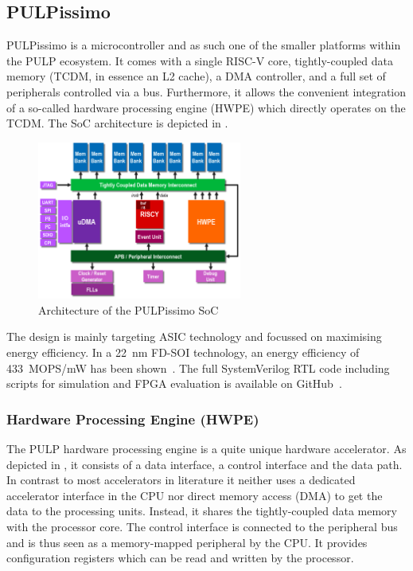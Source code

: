 \documentclass[a4paper, 12pt]{article}
\begin{document}
\subsection{PULPissimo}

PULPissimo is a microcontroller and as such one of the smaller platforms within the PULP ecosystem. It comes with a single RISC-V core, tightly-coupled data memory (TCDM, in essence an L2 cache), a DMA controller, and a full set of peripherals controlled via a bus. Furthermore, it allows the convenient integration of a so-called hardware processing engine (HWPE) which directly operates on the TCDM. The SoC architecture is depicted in .

\begin{figure}
	\centering
	\includegraphics[width=0.6\textwidth]{pulpissimo_arch.png}
	\caption{Architecture of the PULPissimo SoC \cite{pulpissimo}}
	\label{pulpissimo-arch}
\end{figure}

The design is mainly targeting ASIC technology and focussed on maximising energy efficiency. In a \SI{22}{nm} FD-SOI technology, an energy efficiency of \SI{433}{MOPS/mW} has been shown~\cite{Schiavone2018}. The full SystemVerilog RTL code including scripts for simulation and FPGA evaluation is available on GitHub~\cite{pulpissimo}.

\subsubsection*{Hardware Processing Engine (HWPE)}

The PULP hardware processing engine is a quite unique hardware accelerator. As depicted in , it consists of a data interface, a control interface and the data path. In contrast to most accelerators in literature it neither uses a dedicated accelerator interface in the CPU nor direct memory access (DMA) to get the data to the processing units. Instead, it shares the tightly-coupled data memory with the processor core. The control interface is connected to the peripheral bus and is thus seen as a memory-mapped peripheral by the CPU. It provides configuration registers which can be read and written by the processor.
\end{document}
